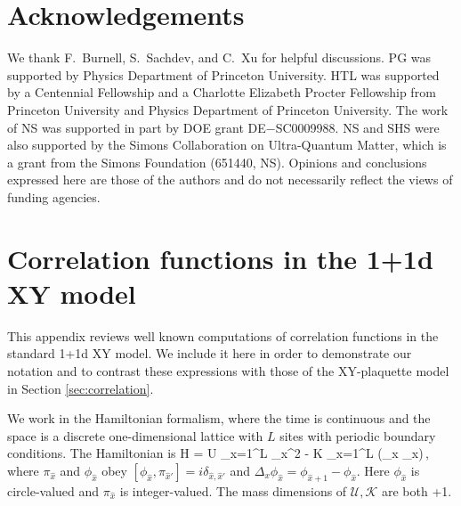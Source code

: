 \documentclass[12pt]{article}
\numberwithin{equation}{section}
\begin{document}
\section*{Acknowledgements}

We thank F.\ Burnell, S.\ Sachdev, and C.\ Xu for helpful discussions. PG was supported by Physics Department of Princeton University.  HTL was supported
by a Centennial Fellowship and a
Charlotte Elizabeth Procter Fellowship from Princeton University and Physics Department of Princeton University. The work of NS was supported in part by DOE grant DE$-$SC0009988.  NS and SHS were also supported by the Simons Collaboration on Ultra-Quantum Matter, which is a grant from the Simons Foundation (651440, NS).
Opinions and conclusions expressed here are those of the authors and do not necessarily reflect the views of funding agencies.

\appendix


\section{Correlation functions in the 1+1d XY model}\label{onepone}

This appendix reviews well known computations of correlation functions in the standard 1+1d XY model.  We include it here in order to demonstrate our notation and to contrast these expressions with those of the XY-plaquette model in Section \ref{sec:correlation}.


We work in the Hamiltonian formalism, where the time is continuous and the space is a discrete one-dimensional lattice with $L$ sites with periodic boundary conditions. The Hamiltonian is
\ie\label{XY1p1}
H  = { \mathcal U } \sum_{\hat x=1}^L \pi_{\hat x}^2 - \mathcal K \sum_{\hat x=1}^L \cos (\Delta_x \phi_{\hat x})\,,
\fe
where $\pi_{\hat x}$ and $\phi_{\hat x}$ obey $[\phi_{\hat x} , \pi_{\hat x'} ] = i \delta_{\hat x, \hat x'}$ and $\Delta_x \phi_{\hat x} = \phi_{\hat x+1} -\phi_{\hat x}$.
Here $\phi_{\hat x}$ is circle-valued  and $\pi_{\hat x}$ is integer-valued.
The mass dimensions of $\mathcal U,\mathcal K$ are both +1.
\end{document}
